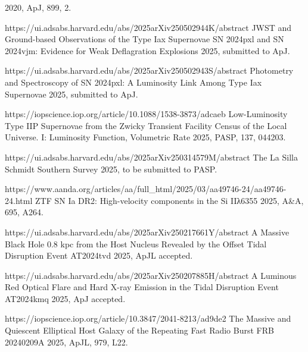 \begin{cvpubs}
{\begin{cvitems}
    {2020, ApJ, 899, 2.}
    \item {}
    {\Cliu}
    {https://ui.adsabs.harvard.edu/abs/2025arXiv250502944K/abstract}
    {JWST and Ground-based Observations of the Type Iax Supernovae SN 2024pxl and SN 2024vjm: Evidence for Weak Deflagration Explosions}
    {2025, submitted to ApJ.}
    \item {}
    {\Cliu}
    {https://ui.adsabs.harvard.edu/abs/2025arXiv250502943S/abstract}
    {Photometry and Spectroscopy of SN 2024pxl: A Luminosity Link Among Type Iax Supernovae}
    {2025, submitted to ApJ.}
    \item {}
    {\Cliu}
    {https://iopscience.iop.org/article/10.1088/1538-3873/adcaeb}
    {Low-Luminosity Type IIP Supernovae from the Zwicky Transient Facility Census of the Local Universe. I: Luminosity Function, Volumetric Rate}
    {2025, PASP, 137, 044203.}
    \item {}
    {\Cliu}
    {https://ui.adsabs.harvard.edu/abs/2025arXiv250314579M/abstract}
    {The La Silla Schmidt Southern Survey}
    {2025, to be submitted to PASP.}
\end{cvitems}
}
\cvpub
{
\begin{cvitems}
    \item {}
    {\Cliu}
    {https://www.aanda.org/articles/aa/full_html/2025/03/aa49746-24/aa49746-24.html}
    {ZTF SN Ia DR2: High-velocity components in the Si IIλ6355}
    {2025, A\&A, 695, A264.}
    \item {}
    {\Cliu}
    {https://ui.adsabs.harvard.edu/abs/2025arXiv250217661Y/abstract}
    {A Massive Black Hole 0.8 kpc from the Host Nucleus Revealed by the Offset Tidal Disruption Event AT2024tvd}
    {2025, ApJL accepted.}
    \item {}
    {\Cliu}
    {https://ui.adsabs.harvard.edu/abs/2025arXiv250207885H/abstract}
    {A Luminous Red Optical Flare and Hard X-ray Emission in the Tidal Disruption Event AT2024kmq}
    {2025, ApJ accepted.}
    \item {}
    {\Cliu}
    {https://iopscience.iop.org/article/10.3847/2041-8213/ad9de2}
    {The Massive and Quiescent Elliptical Host Galaxy of the Repeating Fast Radio Burst FRB 20240209A}
    {2025, ApJL, 979, L22.}
    \item {} 

\end{cvitems}}
\end{cvpubs}
